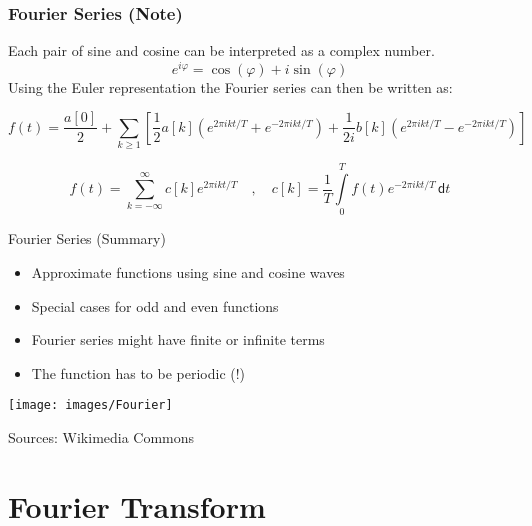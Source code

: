 \begin{frame}
    \frametitle{Fourier Series (Note)}
    Each pair of sine and cosine can be interpreted as a complex number.
    \begin{equation*}
        e^{i\varphi} = \cos(\varphi) + i \sin(\varphi)
    \end{equation*}\newline
    Using the Euler representation the Fourier series can then be written as:


    \begin{equation*}
        f(t) = \dfrac {a[0]}{2} + \sum\limits_{k\ge1} \left[ \frac{1}{2} a[k] \left(e^{2\pi ikt/T} + e^{-2\pi ikt/T} \right)+ \frac{1}{2i} b[k] \left(e^{2\pi ikt/T} - e^{-2\pi ikt/T} \right) \right]
    \end{equation*}

    \begin{equation*}
        f(t) = \sum\limits_{k=-\infty}^{\infty} c[k] e^{2\pi ikt/T} \quad , \quad
        c[k] = \frac{1}{T}\int\limits_{0}^{T} f(t) e^{-2\pi ikt/T}\, \mathsf{d}t
    \end{equation*}
\end{frame}



\begin{frame}[t]{Fourier Series (Summary)}
    \begin{itemize}
        \item Approximate functions using sine and cosine waves
        \item Special cases for odd and even functions
        \item Fourier series might have finite or infinite terms
        \item The function has to be periodic (!)
    \end{itemize}

    \begin{flushright}

        \texttt{[image: images/Fourier]}

        \scriptsize Sources: Wikimedia Commons
    \end{flushright}
\end{frame}



\section{Fourier Transform}%
\label{sec:fourier_transform}



